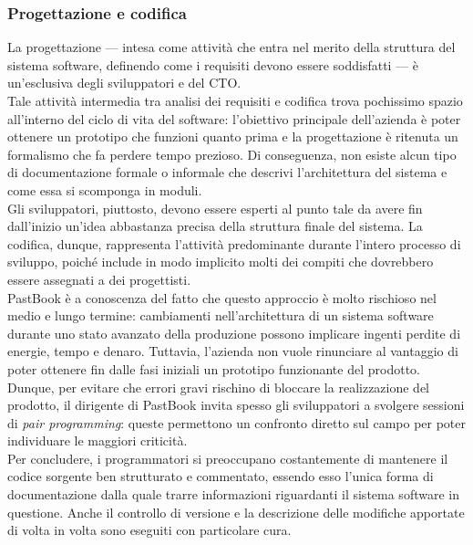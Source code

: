 			\subsubsection{Progettazione e codifica}
				La progettazione — intesa come attività che entra nel merito della struttura del sistema software, definendo come i
				requisiti devono essere soddisfatti — è un'esclusiva degli sviluppatori e del CTO.\\
				Tale attività intermedia tra analisi dei requisiti e codifica trova pochissimo spazio all'interno del ciclo di vita
				del software: l'obiettivo principale dell'azienda è poter ottenere un prototipo che funzioni quanto prima e la
				progettazione è ritenuta un formalismo che fa perdere tempo prezioso. Di conseguenza, non esiste alcun tipo di
				documentazione formale o informale che descrivi l'architettura del sistema e come essa si scomponga in moduli.\\
				Gli sviluppatori, piuttosto, devono essere esperti al punto tale da avere fin dall'inizio un'idea abbastanza precisa
				della struttura finale del sistema. La codifica, dunque, rappresenta l'attività predominante durante l'intero
				processo di sviluppo, poiché include in modo implicito molti dei compiti che dovrebbero essere assegnati a dei
				progettisti.\\
				PastBook è a conoscenza del fatto che questo approccio è molto rischioso nel medio e lungo termine: cambiamenti
				nell'architettura di un sistema software durante uno stato avanzato della produzione possono implicare ingenti
				perdite di energie, tempo e denaro. Tuttavia, l'azienda non vuole rinunciare al vantaggio di poter ottenere fin dalle
				fasi iniziali un prototipo funzionante del prodotto. Dunque, per evitare che errori gravi rischino di bloccare la
				realizzazione del prodotto, il dirigente di PastBook invita spesso gli sviluppatori a svolgere sessioni di
				\emph{pair programming}: queste permettono un confronto diretto sul campo per poter individuare le maggiori
				criticità.\\
				Per concludere, i programmatori si preoccupano costantemente di mantenere il codice sorgente ben strutturato e
				commentato, essendo esso l'unica forma di documentazione dalla quale trarre informazioni riguardanti il sistema
				software in questione. Anche il controllo di versione e la descrizione delle modifiche apportate di volta in volta
				sono eseguiti con particolare cura.

